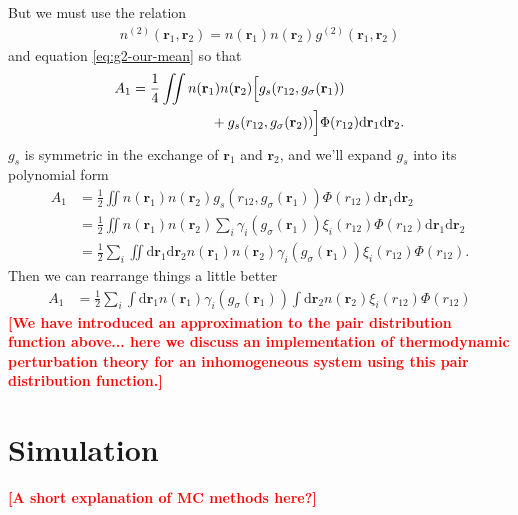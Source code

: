 \documentclass[letterpaper,twocolumn,amsmath,amssymb,pre,aps,10pt]{revtex4-1}
\newcommand\rr{\mathbf{r}}
\newcommand\dd{\mathrm{d}}
\newcommand\fixme[1]{\textcolor{red}{\textbf{[#1]}}}
\begin{document}
But we must use the relation
\begin{align}
  n^{(2)}(\rr_1,\rr_2) = n(\rr_1)n(\rr_2)g^{(2)}(\rr_1,\rr_2)
\end{align}
and equation \ref{eq:g2-our-mean} so that
\begin{align}
  A_1 &=\frac{1}{4}\iint n(\rr_1)n(\rr_2)\Big[
    g_s(r_{12},g_\sigma(\rr_1)) \notag \\
    &\hspace{2cm} + g_s(r_{12},g_\sigma(\rr_2)) \Big] \Phi(r_{12})
  \dd\rr_1 \dd\rr_2.
\end{align}
$g_s$ is symmetric in the exchange of $\rr_1$ and $\rr_2$, and we'll
expand $g_s$ into its polynomial form
\begin{align}
  A_1 &= \frac{1}{2}\iint n(\rr_1)n(\rr_2)g_s(r_{12},g_\sigma(\rr_1))
  \Phi(r_{12}) \dd\rr_1 \dd\rr_2 \\
  &= \frac{1}{2}\iint n(\rr_1)n(\rr_2)\sum_i
  \gamma_i(g_\sigma(\rr_1))\xi_i(r_{12})\Phi(r_{12}) \dd\rr_1 \dd\rr_2 \\
  &= \frac{1}{2} \sum_i \iint \dd\rr_1 \dd\rr_2
  n(\rr_1)n(\rr_2)\gamma_i(g_\sigma(\rr_1)) \xi_i(r_{12})\Phi(r_{12}).
\end{align}
Then we can rearrange things a little better
\begin{align}
  A_1 &= \frac{1}{2} \sum_i \int \dd\rr_1 n(\rr_1)
  \gamma_i(g_\sigma(\rr_1)) \int \dd\rr_2 n(\rr_2)
  \xi_i(r_{12}) \Phi(r_{12})
\end{align}
\fixme{We have introduced an approximation to the pair distribution
  function above... here we discuss an implementation of thermodynamic
  perturbation theory for an inhomogeneous system using this pair
  distribution function.}


\section{Simulation}

\fixme{A short explanation of MC methods here?}


\end{document}
